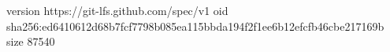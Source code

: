 version https://git-lfs.github.com/spec/v1
oid sha256:ed6410612d68b7fcf7798b085ea115bbda194f2f1ee6b12efcfb46cbe217169b
size 87540
